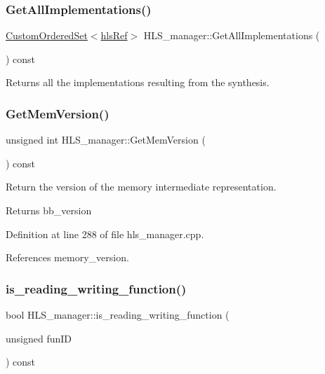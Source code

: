 \subsubsection{\texorpdfstring{Get\+All\+Implementations()}{GetAllImplementations()}}
{\footnotesize\ttfamily \hyperlink{classCustomOrderedSet}{Custom\+Ordered\+Set}$<$\hyperlink{hls_8hpp_a75d0c73923d0ddfa28c4843a802c73a7}{hls\+Ref}$>$ H\+L\+S\+\_\+manager\+::\+Get\+All\+Implementations (\begin{DoxyParamCaption}{ }\end{DoxyParamCaption}) const}



Returns all the implementations resulting from the synthesis. 

\mbox{\label{classHLS__manager_a1ec303c0c29f40a1e9faa003fc71d8ed}} 
\subsubsection{\texorpdfstring{Get\+Mem\+Version()}{GetMemVersion()}}
{\footnotesize\ttfamily unsigned int H\+L\+S\+\_\+manager\+::\+Get\+Mem\+Version (\begin{DoxyParamCaption}{ }\end{DoxyParamCaption}) const}



Return the version of the memory intermediate representation. 

\begin{DoxyReturn}{Returns}
bb\+\_\+version 
\end{DoxyReturn}


Definition at line 288 of file hls\+\_\+manager.\+cpp.



References memory\+\_\+version.

\mbox{\label{classHLS__manager_a2f8e9a8fb92f0d197f5b5e0eee2821bc}} 
\subsubsection{\texorpdfstring{is\+\_\+reading\+\_\+writing\+\_\+function()}{is\_reading\_writing\_function()}}
{\footnotesize\ttfamily bool H\+L\+S\+\_\+manager\+::is\+\_\+reading\+\_\+writing\+\_\+function (\begin{DoxyParamCaption}\item[{unsigned}]{fun\+ID }\end{DoxyParamCaption}) const}



